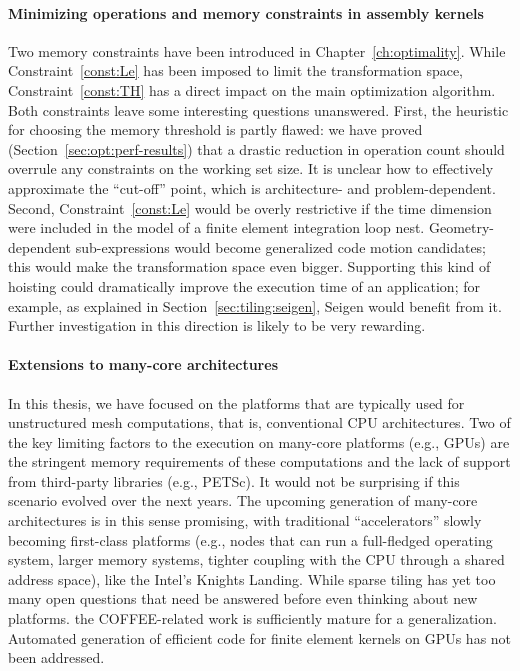 \paragraph{Minimizing operations and memory constraints in assembly kernels}
Two memory constraints have been introduced in Chapter~\ref{ch:optimality}. While Constraint~\ref{const:Le} has been imposed to limit the transformation space, Constraint~\ref{const:TH} has a direct impact on the main optimization algorithm. Both constraints leave some interesting questions unanswered. First, the heuristic for choosing the memory threshold is partly flawed: we have proved (Section~\ref{sec:opt:perf-results}) that a drastic reduction in operation count should overrule any constraints on the working set size. It is unclear how to effectively approximate the ``cut-off'' point, which is architecture- and problem-dependent. Second, Constraint~\ref{const:Le} would be overly restrictive if the time dimension were included in the model of a finite element integration loop nest. Geometry-dependent sub-expressions would become generalized code motion candidates; this would make the transformation space even bigger. Supporting this kind of hoisting could dramatically improve the execution time of an application; for example, as explained in Section~\ref{sec:tiling:seigen}, Seigen would benefit from it. Further investigation in this direction is likely to be very rewarding.

\paragraph{Extensions to many-core architectures}
In this thesis, we have focused on the platforms that are typically used for unstructured mesh computations, that is, conventional CPU architectures. Two of the key limiting factors to the execution on many-core platforms (e.g., GPUs) are the stringent memory requirements of these computations and the lack of support from third-party libraries (e.g., PETSc). It would not be surprising if this scenario evolved over the next years. The upcoming generation of many-core architectures is in this sense promising, with traditional ``accelerators'' slowly becoming first-class platforms (e.g., nodes that can run a full-fledged operating system, larger memory systems, tighter coupling with the CPU through a shared address space), like the Intel's Knights Landing. While sparse tiling has yet too many open questions that need be answered before even thinking about new platforms. the COFFEE-related work is sufficiently mature for a generalization. Automated generation of efficient code for finite element kernels on GPUs has not been addressed.

